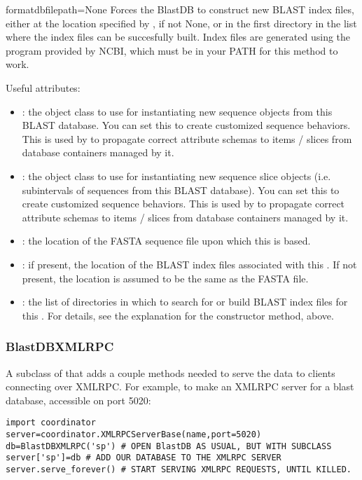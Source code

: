 \documentclass{howto}
\begin{document}
\begin{funcdesc}{formatdb}{filepath=None}
  Forces the BlastDB to construct new BLAST index files, either at the
  location specified by , if not None, or in the first
  directory in the  list where the index files
  can be succesfully built.  Index files are generated using the 
   program provided by NCBI, which must be in your
  PATH for this method to work.
\end{funcdesc}



Useful attributes:
\begin{itemize}

\item
{}: the object class to use for instantiating new sequence objects from this BLAST database.  You can set this to create customized sequence behaviors.  
This is used by  to propagate correct attribute schemas to
items / slices from database containers managed by it.

\item
{}: the object class to use for instantiating new sequence slice objects (i.e. subintervals of sequences from this BLAST database).  You can set this to create customized sequence behaviors.
This is used by  to propagate correct attribute schemas to
items / slices from database containers managed by it.

\item
{}: the location of the FASTA sequence file upon which
this  is based.

\item
{}: if present, the location of the BLAST index files
associated with this .  If not present, the location is assumed
to be the same as the FASTA file.

\item
{}: the list of directories in which to search for
or build BLAST index files for this .  For details, see
the explanation for the constructor method, above.

\end{itemize}

\subsubsection{BlastDBXMLRPC}
A subclass of  that adds a couple methods needed to serve
the data to clients connecting over XMLRPC.  For example, to make an XMLRPC
server for a blast database, accessible on port 5020:
\begin{verbatim}
import coordinator
server=coordinator.XMLRPCServerBase(name,port=5020)
db=BlastDBXMLRPC('sp') # OPEN BlastDB AS USUAL, BUT WITH SUBCLASS
server['sp']=db # ADD OUR DATABASE TO THE XMLRPC SERVER
server.serve_forever() # START SERVING XMLRPC REQUESTS, UNTIL KILLED.
\end{verbatim}
\end{document}
